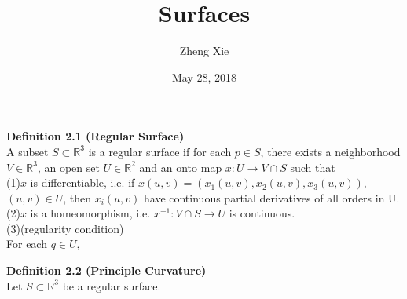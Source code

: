 \documentclass{article}
\author{Zheng Xie}
\title{Surfaces}
\date{May 28, 2018}
\begin{document}
\maketitle
    
\setlength\parindent{0em}   %
\setlength\parskip{1.0\baselineskip} %
    
\par
\textbf{Definition 2.1 (Regular Surface)}\\
A subset $S \subset \mathbb R^3$ is a regular surface if for each $p \in S$, there exists a neighborhood
$V \in \mathbb R^3$, an open set $U \in \mathbb R^2$ and an onto map $x:U \to V \cap S$ such that\\
(1)$x$ is differentiable, i.e. if $x(u,v) = (x_1(u,v),x_2(u,v),x_3(u,v))$, $(u,v) \in U$, then $x_i(u,v)$
have continuous partial derivatives of all orders in U.\\
(2)$x$ is a homeomorphism, i.e. $x^{-1}: V \cap S \to U$ is continuous.\\
(3)(regularity condition)\\For each $q \in U$, 

\par
\textbf{Definition 2.2 (Principle Curvature)}\\
Let $S \subset \mathbb R^3$ be a regular surface.
\end{document}

